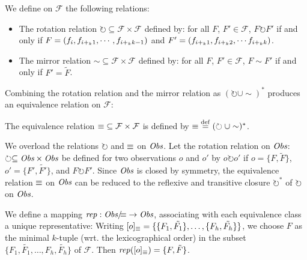 We define on $\mathcal{F}$ the following relations:
\begin{itemize}
\item The rotation relation $\circlearrowright \subseteq \mathcal{F} \times \mathcal{F}$  defined by: for all  $F$, $F'\in \mathcal{F}$, $F \circlearrowright F'$ if and only if $F=(f_i,f_{i+_k1}, \cdots, f_{i+_k k-1})$ and $F'=(f_{i+_k1}, f_{i+_k2}, \cdots f_{i+_k k})$.
\item The mirror relation  $\sim\subseteq \mathcal{F} \times \mathcal{F}$ defined by: for all  $F$, $F'\in \mathcal{F}$, $F\sim F'$
if and only if $F'=\tilde{F}$.
\end{itemize}

Combining the rotation relation and the mirror relation as  $(\circlearrowright\cup \sim)^*$ produces an equivalence relation on $\mathcal{F}:$ 
\begin{definition}
\label{def:obsEq}
 The equivalence relation ${\equiv}\subseteq \mathcal{F}\times\mathcal{F}$ is defined by ${\equiv} \stackrel{\mathrm{def}}{=} {(\circlearrowright\cup \sim)^*}$.
\end{definition}

We overload the relations $\circlearrowright$ and $\equiv$ on $\textit{Obs}$. Let the rotation relation on $\textit{Obs}$: $\circlearrowright \subseteq \textit{Obs} \times \textit{Obs}$ be defined for two observations $o$ and $o'$ by $o\circlearrowright o'$ if $o=\{F, \tilde{F}\}$, $o'=\{F',\tilde{F'}\}$, and $F \circlearrowright F'$.
Since $\textit{Obs}$ is closed by symmetry, the equivalence relation $\equiv$ on $\textit{Obs}$ can be reduced to the reflexive and transitive closure $\circlearrowright^*$ of $\circlearrowright$ on $\textit{Obs}$.

We define a mapping $\mathit{rep}:{\textit{Obs}/\!\!\!\equiv} \rightarrow
\textit{Obs}$, associating with each equivalence class a unique
representative:
Writing $[o]_{\equiv} = \{ \{F_1, \tilde{F_1}\}, \ldots, \{F_h, \tilde{F_h}\}\}$, 
we choose $F$ as the minimal $k$-tuple (wrt. the lexicographical order) in the subset 
$\{F_1, \tilde{F_1}, \ldots, F_h, \tilde{F_h}\}$ of $\mathcal{F}$. Then $\mathit{rep}([o]_{\equiv})= \{F, \tilde{F}\}$.

